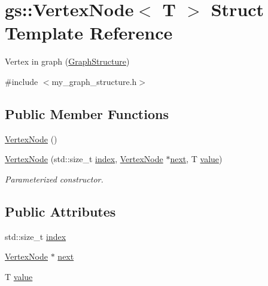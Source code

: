 \hypertarget{structgs_1_1_vertex_node}{}\section{gs\+:\+:Vertex\+Node$<$ T $>$ Struct Template Reference}
\label{structgs_1_1_vertex_node}


Vertex in graph (\mbox{\hyperlink{classgs_1_1_graph_structure}{Graph\+Structure}})  




{\ttfamily \#include $<$my\+\_\+graph\+\_\+structure.\+h$>$}

\subsection*{Public Member Functions}
\begin{DoxyCompactItemize}
\item 
\mbox{\hyperlink{structgs_1_1_vertex_node_af11908bdb28303e9d9ee6eccdfe50b67}{Vertex\+Node}} ()
\item 
\mbox{\hyperlink{structgs_1_1_vertex_node_a82bd37d0baf6474fb174a3bf5f9147ed}{Vertex\+Node}} (std\+::size\+\_\+t \mbox{\hyperlink{structgs_1_1_vertex_node_a8dd82fa9a0b37a0194368dcd7752b04a}{index}}, \mbox{\hyperlink{structgs_1_1_vertex_node}{Vertex\+Node}} $\ast$\mbox{\hyperlink{structgs_1_1_vertex_node_a7fc257ce53eb77e180531b39bb303250}{next}}, T \mbox{\hyperlink{structgs_1_1_vertex_node_a0bc246c7c0bfbea6354d90c704761fd3}{value}})
\begin{DoxyCompactList}\small\item\em Parameterized constructor. \end{DoxyCompactList}\end{DoxyCompactItemize}
\subsection*{Public Attributes}
\begin{DoxyCompactItemize}
\item 
std\+::size\+\_\+t \mbox{\hyperlink{structgs_1_1_vertex_node_a8dd82fa9a0b37a0194368dcd7752b04a}{index}}
\item 
\mbox{\hyperlink{structgs_1_1_vertex_node}{Vertex\+Node}} $\ast$ \mbox{\hyperlink{structgs_1_1_vertex_node_a7fc257ce53eb77e180531b39bb303250}{next}}
\item 
T \mbox{\hyperlink{structgs_1_1_vertex_node_a0bc246c7c0bfbea6354d90c704761fd3}{value}}
\end{DoxyCompactItemize}


